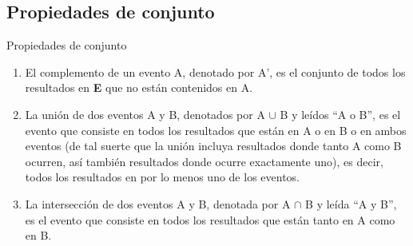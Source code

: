 \documentclass[11pt]{beamer}
\begin{document}
      \subsection*{Propiedades de conjunto}
        \begin{frame}{}
          \begin{block}{Propiedades de conjunto}
              \begin{enumerate}[<+->]
                  \item El complemento de un evento A, denotado por A', es el conjunto de todos los resultados en \textbf{E} que no están contenidos en A.
                  \item La unión de dos eventos A y B, denotados por A $\cup$ B y leídos “A o B”, es el evento que consiste en todos los resultados que están en A o en B o en ambos eventos (de tal suerte que la unión incluya resultados donde tanto A como B ocurren, así también resultados donde ocurre exactamente uno), es decir, todos los resultados en por lo menos uno de los eventos.
                  \item La intersección de dos eventos A y B, denotada por A $\cap$ B y leída “A y B”, es el evento que consiste en todos los resultados que están tanto en A como en B.
              \end{enumerate}
          \end{block}
        \end{frame}
\end{document}
